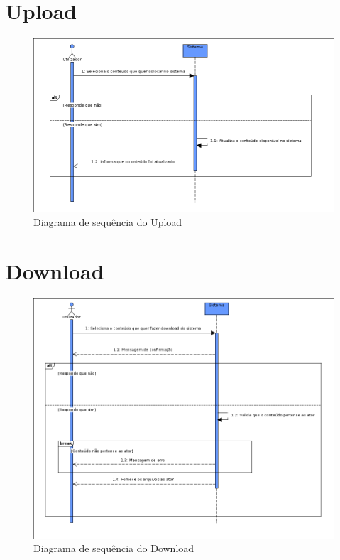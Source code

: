 \documentclass[a4paper]{report}
\begin{document}
\section{Upload}
\begin{figure}[H]
	\centering 
    \includegraphics[width=\textwidth]{images/uploadSeq.png}  
    \caption{Diagrama de sequência do Upload}
\end{figure}

\section{Download}
\begin{figure}[H]
	\centering 
    \includegraphics[width=\textwidth]{images/downloadSeq.png}  
    \caption{Diagrama de sequência do Download}
\end{figure}
\end{document}
